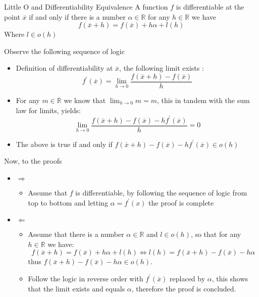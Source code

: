 \documentclass[preview]{standalone}
\begin{document}
\begin{prop*}{Little O and Differentiability Equivalence}
  A function $f$ is differentiable at the point $\overline{x}$ if and only if there is a number $ \alpha \in \mathbb{R}$ for any $h \in \mathbb{R}$ we have 
  \[
  f\left(\overline{x}  +  h\right) = f\left(\overline{x}\right)  +  h \alpha  +  l\left(h\right)
  \]
  Where $l \in o\left(h\right) $ 
  \begin{pf}
    Observe the following sequence of logic
    \begin{itemize}
      \item Definition of differentiability at $\overline{x}$, the following limit exists :
        \[
        f ^{\prime}\left(\overline{x}\right) = \lim_{h\to0}\frac{f\left(\overline{x}  +  h\right)  -  f\left(\overline{x}\right)}{h}
        \]
      \item For any $m \in \mathbb{R}$ we know that $\lim_{h\to0} m = m$, this in tandem with the sum law for limits, yields:
        \[
       \lim_{h\to0} \frac{f\left(\overline{x}  +  h\right)  -  f\left(\overline{x}\right)  -  h f ^{\prime}\left(\overline{x}\right)}{h} = 0
        \]
      \item The above is true if and only if $f\left(\overline{x}  +  h\right)  -  f\left(\overline{x}\right)  -  h f ^{\prime}\left(\overline{x}\right) \in o\left(h\right)$ 
    \end{itemize}
    Now, to the proofs
    \begin{itemize}
      \item $\Rightarrow$ 
        \begin{itemize}
          \item Assume that $f$ is differentiable, by following the sequence of logic from top to bottom and letting $\alpha = f ^{\prime}\left(x\right)$ the proof is complete
        \end{itemize}
      \item $\Leftarrow$ 
        \begin{itemize}
          \item Assume that there is a number $\alpha \in \mathbb{R}$ and $l \in o\left(h\right)$, so that for any $h \in \mathbb{R}$  we have:
            \[
            f\left(\overline{x}  +  h\right) = f\left(\overline{x}\right)  +  h \alpha+  l\left(h\right) \Leftrightarrow l\left(h\right) = f\left(\overline{x}  +  h\right)  -  f\left(\overline{x}\right)  -  h \alpha
            \]
            thus $f\left(\overline{x}  +  h\right)  -  f\left(\overline{x}\right)  -  h \alpha \in o\left(h\right)$.
        \item Follow the logic in reverse order with $f ^{\prime}\left(\overline{x}\right)$ replaced by $\alpha$, this shows that the limit exists and equals $\alpha$, therefore the proof is concluded.
        \end{itemize}

    \end{itemize}
  \end{pf}

\end{prop*}
\end{document}
